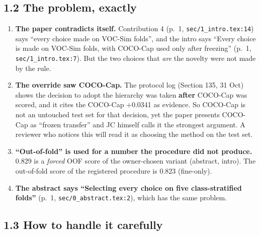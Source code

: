 \documentclass[
  10pt,
]{article}
\providecommand{\tightlist}{%
  \setlength{\itemsep}{0pt}\setlength{\parskip}{0pt}}
\begin{document}
\subsection{1.2 The problem, exactly}

\begin{enumerate}
\def\labelenumi{\arabic{enumi}.}
\tightlist
\item
  \textbf{The paper contradicts itself.} Contribution 4 (p.~1,
  \texttt{sec/1\_intro.tex:14}) says ``every choice made on VOC-Sim
  folds'', and the intro says ``Every choice is made on VOC-Sim folds,
  with COCO-Cap used only after freezing'' (p.~1,
  \texttt{sec/1\_intro.tex:7}). But the two choices that \emph{are} the
  novelty were not made by the rule.
\item
  \textbf{The override saw COCO-Cap.} The protocol log (Section 135, 31
  Oct) shows the decision to adopt the hierarchy was taken
  \textbf{after} COCO-Cap was scored, and it cites the COCO-Cap +0.0341
  as evidence. So COCO-Cap is not an untouched test set for that
  decision, yet the paper presents COCO-Cap as ``frozen transfer'' and
  JC himself calls it the strongest argument. A reviewer who notices
  this will read it as choosing the method on the test set.
\item
  \textbf{``Out-of-fold'' is used for a number the procedure did not
  produce.} 0.829 is a \emph{forced} OOF score of the owner-chosen
  variant (abstract, intro). The out-of-fold score of the registered
  procedure is 0.823 (fine-only).
\item
  \textbf{The abstract says ``Selecting every choice on five
  class-stratified folds''} (p.~1, \texttt{sec/0\_abstract.tex:2}),
  which has the same problem.
\end{enumerate}

\subsection{1.3 How to handle it carefully}
\end{document}
